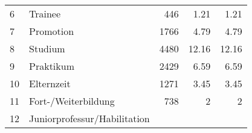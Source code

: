 \begin{longtable}{lXrrr}
     6 &
     \multicolumn{1}{X}{ Trainee   } &


       \num{446} &
       \num[round-mode=places,round-precision=2]{1.21} &
         \num[round-mode=places,round-precision=2]{1.21} \\

     7 &
     \multicolumn{1}{X}{ Promotion   } &


       \num{1766} &
       \num[round-mode=places,round-precision=2]{4.79} &
         \num[round-mode=places,round-precision=2]{4.79} \\

     8 &
     \multicolumn{1}{X}{ Studium   } &


       \num{4480} &
       \num[round-mode=places,round-precision=2]{12.16} &
         \num[round-mode=places,round-precision=2]{12.16} \\

     9 &
     \multicolumn{1}{X}{ Praktikum   } &


       \num{2429} &
       \num[round-mode=places,round-precision=2]{6.59} &
         \num[round-mode=places,round-precision=2]{6.59} \\

     10 &
     \multicolumn{1}{X}{ Elternzeit   } &


       \num{1271} &
       \num[round-mode=places,round-precision=2]{3.45} &
         \num[round-mode=places,round-precision=2]{3.45} \\

     11 &
     \multicolumn{1}{X}{ Fort-/Weiterbildung   } &


       \num{738} &
       \num[round-mode=places,round-precision=2]{2} &
         \num[round-mode=places,round-precision=2]{2} \\

     12 &
     \multicolumn{1}{X}{ Juniorprofessur/Habilitation   } &



\end{longtable}
